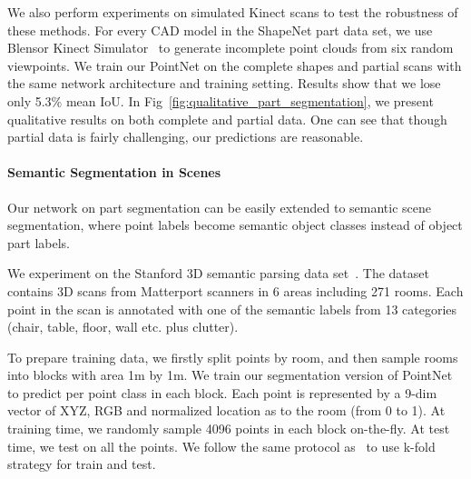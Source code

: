 \documentclass[10pt,twocolumn,letterpaper]{article}
\begin{document}
We also perform experiments on simulated Kinect scans to test the robustness of these methods. For every CAD model in the ShapeNet part data set, we use Blensor Kinect Simulator~\cite{Gschwandtner11b} to generate incomplete point clouds from six random viewpoints. We train our PointNet on the complete shapes and partial scans with the same network architecture and training setting. Results show that we lose only 5.3\% mean IoU. In Fig~\ref{fig:qualitative_part_segmentation}, we present qualitative results on both complete and partial data. One can see that though partial data is fairly challenging, our predictions are reasonable.





\begin{comment}
\begin{table}[h!]
    \small
    \centering
    \begin{tabular}[width=\linewidth]{l|cccc}
    \hline
    ~ & complete input & partial input \\ \hline
    3D CNN & 75.3 & 69.7 \\ \hline
    Ours PointNet & \textbf{80.6} & \textbf{75.3}  \\ \hline
    \end{tabular}
    \caption{\textbf{Segmentation results on partial scans.} Metric is mean IoU across all shapes.}
\label{tab:segmentation_partial}
\end{table}
\end{comment}

\paragraph{Semantic Segmentation in Scenes} Our network on part segmentation can be easily extended to semantic scene segmentation, where point labels become semantic object classes instead of object part labels.






We experiment on the Stanford 3D semantic parsing data set~\cite{armeni_cvpr16}. The dataset contains 3D scans from Matterport scanners in 6 areas including 271 rooms. Each point in the scan is annotated with one of the semantic labels from 13 categories (chair, table, floor, wall etc. plus clutter).

To prepare training data, we firstly split points by room, and then sample rooms into blocks with area 1m by 1m. We train our segmentation version of PointNet to predict per point class in each block. Each point is represented by a 9-dim vector of XYZ, RGB and normalized location as to the room (from 0 to 1). At training time, we randomly sample 4096 points in each block on-the-fly. At test time, we test on all the points. We follow the same protocol as~\cite{armeni_cvpr16} to use k-fold strategy for train and test.
\end{document}
